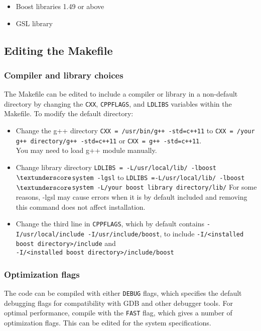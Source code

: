 \documentclass[11pt, oneside]{article}   	%
\begin{document}
\begin{itemize}
\item Boost libraries 1.49 or above
\item  GSL library
\end{itemize} 

\subsection{Editing the Makefile}

\subsubsection{Compiler and library choices}

The Makefile can be edited to include a compiler or library in a non-default directory by changing the \texttt{CXX}, \texttt{CPPFLAGS}, and \texttt{LDLIBS} variables within the Makefile. To modify the default directory: \\

\begin{itemize}
\item Change the g++ directory \texttt{CXX = /usr/bin/g++ -std=c++11} to
 	    \texttt{CXX = /your g++ directory/g++ -std=c++11} or \texttt{CXX = g++ -std=c++11}.\\
You may need to load g++ module manually.\\
\item Change library directory \texttt{LDLIBS = -L/usr/local/lib/ -lboost$\textunderscore$system -lgsl} to 
		\texttt{LDLIBS =-L/usr/local/lib/ -lboost$\textunderscore$system -L/your boost library directory/lib/} 
		For some reasons, -lgsl may cause errors when it is by default included and removing this command does not affect installation. \\
\item Change the third line in \texttt{CPPFLAGS}, which by default contains \texttt{-I/usr/local/include -I/usr/include/boost}, to include 
		\texttt{-I/<installed boost directory>/include} and \\ \texttt{-I/<installed boost directory>/include/boost}

\end{itemize}		
		
\subsubsection{Optimization flags}

The code can be compiled with either \texttt{DEBUG} flags, which specifies the default debugging flags for compatibility with GDB and other debugger tools. For optimal performance, compile with the \texttt{FAST} flag, which gives a number of optimization flags. This can be edited for the system specifications.
\end{document}
